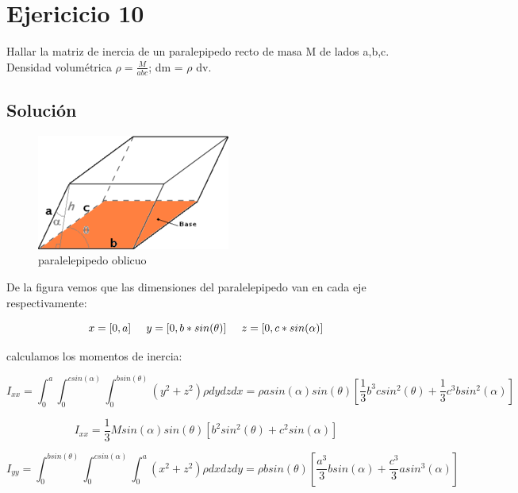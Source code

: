 \documentclass[12 pt]{article}
\begin{document}
\section*{Ejericicio 10}
Hallar la matriz de inercia de un paralepipedo recto de masa M de lados a,b,c. Densidad volumétrica $\rho =\frac{M}{abc}$; dm = $\rho$ dv.


\subsection*{Solución}
 
\begin{figure}[H]
	\centering
	\includegraphics[scale= 0.6]{imagenes/a3.png}
	\caption{paralelepipedo oblicuo}
	\label{parelelepipedo}
\end{figure}


De la figura vemos que las dimensiones del paralelepipedo van en cada eje respectivamente:


\begin{equation*}
x = [0,a] \hspace{0.5cm} y= [0, b* sin(\theta)] \hspace{0.5cm} z= [0, c*sin(\alpha)]
\end{equation*}

calculamos los momentos de inercia:


\begin{equation*}
I_{xx}=\int_{0}^{a}\int_{0}^{csin(\alpha)}\int_{0}^{bsin(\theta)} (y^{2} + z^{2})\rho dydzdx = \rho a sin(\alpha) sin(\theta) \left[ \frac{1}{3}b^{3}csin^{2}(\theta) + \frac{1}{3}c^{3}b sin^{2}(\alpha)\right]
\end{equation*}


\begin{equation*}
I_{xx}= \frac{1}{3}Msin(\alpha) sin(\theta) \left
[b^{2}sin^{2}(\theta) + c^{2} sin(\alpha)\right]
\end{equation*}


\begin{equation*}
I_{yy}=\int_{0}^{bsin(\theta)}\int_{0}^{csin(\alpha)}\int_{0}^{a} (x^{2} + z^{2})\rho dxdzdy = \rho b sin(\theta) \left[\frac{a^{3}}{3} b sin(\alpha) + \frac{c^{3}}{3}asin^{3}(\alpha)\right]
\end{equation*}
\end{document}
